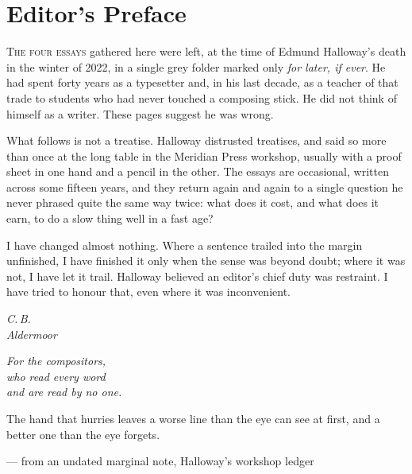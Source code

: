 \documentclass[11pt,twoside,post]{octavo}
\newenvironment{pullquote}
  {\begin{tcolorbox}[
    colback=parchment,
    colframe=claret,
    boxrule=0.4pt,
    left=8pt,right=8pt,top=6pt,bottom=6pt,
    arc=0pt,
    fontupper=\itshape\small\color{inkblue}
  ]}
  {\end{tcolorbox}}
\begin{document}
\chapter{Editor's Preface}

\lettrine[lines=3,loversize=0.1,lraise=0.05]{T}{he four essays} gathered here were left, at the time of Edmund Halloway's death in the winter of 2022, in a single grey folder marked only \emph{for later, if ever}. He had spent forty years as a typesetter and, in his last decade, as a teacher of that trade to students who had never touched a composing stick. He did not think of himself as a writer. These pages suggest he was wrong.

What follows is not a treatise. Halloway distrusted treatises, and said so more than once at the long table in the Meridian Press workshop, usually with a proof sheet in one hand and a pencil in the other. The essays are occasional, written across some fifteen years, and they return again and again to a single question he never phrased quite the same way twice: what does it cost, and what does it earn, to do a slow thing well in a fast age?

I have changed almost nothing. Where a sentence trailed into the margin unfinished, I have finished it only when the sense was beyond doubt; where it was not, I have let it trail. Halloway believed an editor's chief duty was restraint. I have tried to honour that, even where it was inconvenient.

\begin{flushright}
\textit{C.\,B.}\\
\textit{Aldermoor}
\end{flushright}

\cleardoublepage

\thispagestyle{empty}
\vspace*{0.35\textheight}
\begin{center}
\textit{For the compositors,\\ who read every word\\ and are read by no one.}
\end{center}
\cleardoublepage

\thispagestyle{empty}
\vspace*{0.3\textheight}
\begin{center}
\begin{pullquote}
\begin{center}
The hand that hurries leaves a worse line than the eye can see at first, and a better one than the eye forgets.
\end{center}
\end{pullquote}

\vspace{0.8em}
\small --- from an undated marginal note, Halloway's workshop ledger
\end{center}
\cleardoublepage
\end{document}
